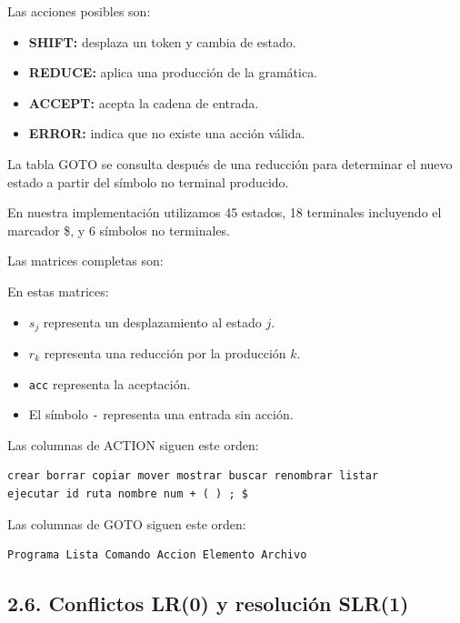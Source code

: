 \documentclass[11pt,letterpaper]{article}
\begin{document}
Las acciones posibles son:

\begin{itemize}
    \item \textbf{SHIFT:} desplaza un token y cambia de estado.
    \item \textbf{REDUCE:} aplica una producción de la gramática.
    \item \textbf{ACCEPT:} acepta la cadena de entrada.
    \item \textbf{ERROR:} indica que no existe una acción válida.
\end{itemize}

La tabla GOTO se consulta después de una reducción
para determinar el nuevo estado a partir del símbolo
no terminal producido.

En nuestra implementación utilizamos 45 estados,
18 terminales incluyendo el marcador \$,
y 6 símbolos no terminales.

Las matrices completas son:


En estas matrices:

\begin{itemize}
    \item $s_j$ representa un desplazamiento al estado $j$.
    \item $r_k$ representa una reducción por la producción $k$.
    \item \texttt{acc} representa la aceptación.
    \item El símbolo \texttt{-} representa una entrada sin acción.
\end{itemize}

Las columnas de ACTION siguen este orden:

\begin{Verbatim}[fontsize=\scriptsize]
crear borrar copiar mover mostrar buscar renombrar listar
ejecutar id ruta nombre num + ( ) ; $
\end{Verbatim}

Las columnas de GOTO siguen este orden:

\begin{Verbatim}[fontsize=\scriptsize]
Programa Lista Comando Accion Elemento Archivo
\end{Verbatim}


\subsection*{2.6. Conflictos LR(0) y resolución SLR(1)}
\end{document}

